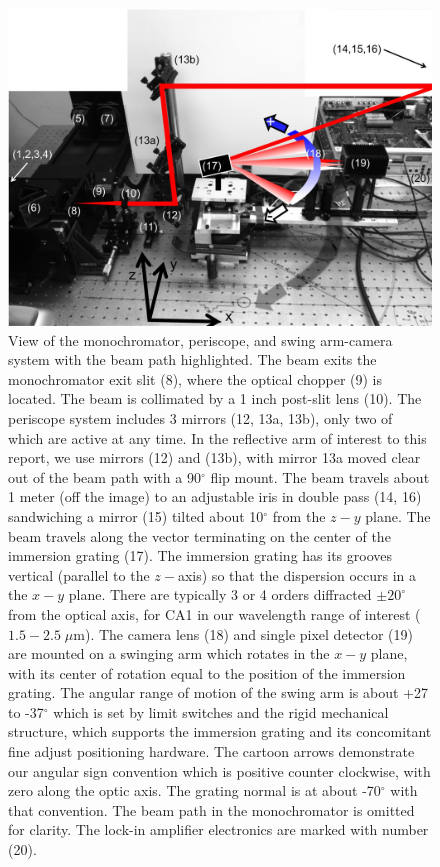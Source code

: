 \begin{figure}
\begin{center}
    \includegraphics[width=1.0\textwidth]{chSPIE_2012_CA1/figs/GTA_cam_model_ref_tilt.jpg}
  \end{center}
  \caption[Schematic of the CROWBAR: Custom Robotic Order, Wavelength, and Blaze Angle Recorder]{\label{fig:GTAview} View of the monochromator, periscope, and swing arm-camera system with the beam path highlighted.  The beam exits the monochromator exit slit (8), where the optical chopper (9) is located.  The beam is collimated by a 1 inch post-slit lens (10).  The periscope system includes 3 mirrors (12, 13a, 13b), only two of which are active at any time.  In the reflective arm of interest to this report, we use mirrors (12) and (13b), with mirror 13a moved clear out of the beam path with a 90$^\circ$ flip mount.  The beam travels about 1 meter (off the image) to an adjustable iris in double pass (14, 16) sandwiching a mirror (15) tilted about 10$^\circ$ from the $z-y$ plane.  The beam travels along the vector terminating on the center of the immersion grating (17).  The immersion grating has its grooves vertical (parallel to the $z-$axis) so that the dispersion occurs in a the $x-y$ plane.  There are typically 3 or 4 orders diffracted $\pm20^\circ$ from the optical axis, for CA1 in our wavelength range of interest ($1.5-2.5 \; \mu$m).  The camera lens (18) and single pixel detector (19) are mounted on a swinging arm which rotates in the $x-y$ plane, with its center of rotation equal to the position of the immersion grating.  The angular range of motion of the swing arm is about +27 to -37$^\circ$ which is set by limit switches and the rigid mechanical structure, which supports the immersion grating and its concomitant fine adjust positioning hardware.  The cartoon arrows demonstrate our angular sign convention which is positive counter clockwise, with zero along the optic axis.  The grating normal is at about -70$^\circ$ with that convention.  The beam path in the monochromator is omitted for clarity.  The lock-in amplifier electronics are marked with number (20).}
\end{figure}

